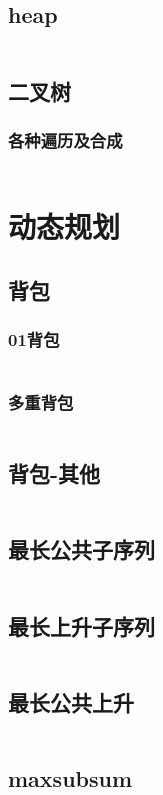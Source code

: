 \documentclass[a4paper,11pt]{article}
\begin{document}
\subsection{heap}
\inputminted[breaklines]{c++}{ds/heap.cpp}
\subsection{二叉树}
\subsubsection{各种遍历及合成}
\inputminted[breaklines]{c++}{ds/bitree.cpp}

\section{动态规划}

\subsection{背包}
\subsubsection{01背包}	
\inputminted[breaklines]{c++}{dp/01bag.cpp}
\subsubsection{多重背包}
\inputminted[breaklines]{c++}{dp/multibag.cpp}
\subsection{背包-其他}
\inputminted[breaklines]{c++}{dp/bag_others.cpp}
\subsection{最长公共子序列}
\inputminted[breaklines]{c++}{dp/lcs.cpp}

\subsection{最长上升子序列}
\inputminted[breaklines]{c++}{dp/lis.cpp}
\subsection{最长公共上升}
\inputminted[breaklines]{c++}{dp/lcis.cpp}
\subsection{maxsubsum}
\inputminted[breaklines]{c++}{dp/max_sub_sum.cpp}
\end{document}

